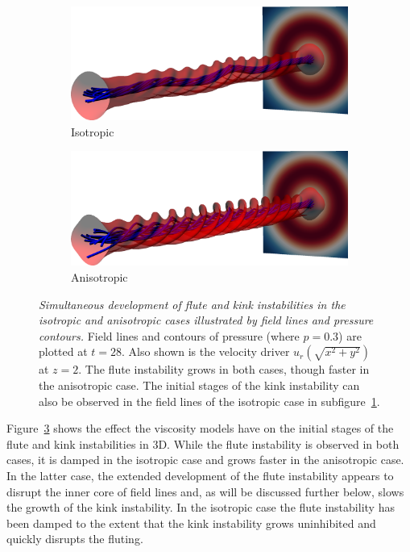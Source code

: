 \documentclass[fleqn,usenatbib]{mnras}
\newcommand{\mycaption}[2]{\caption[#1]{\emph{#1} #2}}
\begin{document}
\begin{figure}
  \centering
    \begin{subfigure}{0.49\textwidth}
      \includegraphics[width=\linewidth]{field_line_plots/cropped/v-4r-4-isotropic_0014_cropped.png}
      \caption{Isotropic}
      \label{fig:field_line_plots_iso}
    \end{subfigure}
    \hfill
    \begin{subfigure}{0.49\textwidth}
      \includegraphics[width=\linewidth]{field_line_plots/cropped/v-4r-4-switching_0014_cropped.png}
      \caption{Anisotropic}
      \label{fig:field_line_plots_swi}
    \end{subfigure}
\mycaption{Simultaneous development of flute and kink instabilities in the
isotropic and anisotropic cases illustrated by field lines and pressure
contours.}{Field lines and contours of pressure (where $p=0.3$) are plotted at
$t=28$. Also shown is the velocity driver $u_r(\sqrt{x^2+y^2})$ at $z=2$. The
flute instability grows in both cases, though faster in the anisotropic case.
The initial stages of the kink instability can also be observed in the field
lines of the isotropic case in subfigure~\ref{fig:field_line_plots_iso}.}
\label{fig:kink_field_line_plots}%
\end{figure}

Figure~\ref{fig:kink_field_line_plots} shows the effect the viscosity models
have on the initial stages of the flute and kink instabilities in 3D. While the
flute instability is observed in both cases, it is damped in the isotropic case
and grows faster in the anisotropic case. In the latter case, the extended
development of the flute instability appears to disrupt the inner core of field
lines and, as will be discussed further below, slows the growth of the kink
instability. In the isotropic case the flute instability has been damped to
the extent that the kink instability grows uninhibited and quickly disrupts the
fluting. 
\end{document}
